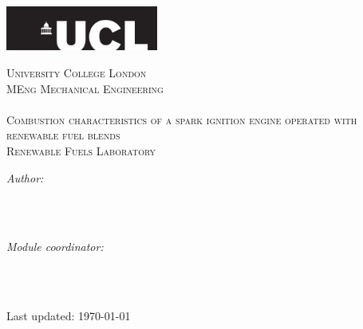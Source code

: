 \begin{titlepage}

  \newcommand{\HRule}{\rule{\linewidth}{0.5mm}} %


  \center
  \includegraphics[width=5cm]{Title/UCL.png}\\[1cm] %

  \center %


  \textsc{\LARGE University College London }\\[1.5cm]
  \textsc{\Large MEng Mechanical Engineering  }\\[0.5cm]
  \textsc{\large \mymodulename }\\[1.5cm]

  \makeatletter
  { \LARGE \textsc{Combustion characteristics of a spark ignition engine operated with renewable fuel blends\\[0.25cm]Renewable Fuels Laboratory}}\\[1.5cm] %


  \begin{minipage}{0.4\textwidth}
    \begin{flushleft} \large
      \emph{Author:}\\
      \myauthor
      \\[1.2em]
    \end{flushleft}
  \end{minipage}
  ~
  \begin{minipage}{0.4\textwidth}
    \begin{flushright} \large
      \emph{Module coordinator:} \\
      \myprof \\[1.2em]
    \end{flushright}
  \end{minipage}\\[2cm]
  \makeatother


  {\large Last updated: \today}\\[2cm]
  \vfill %

\end{titlepage}
